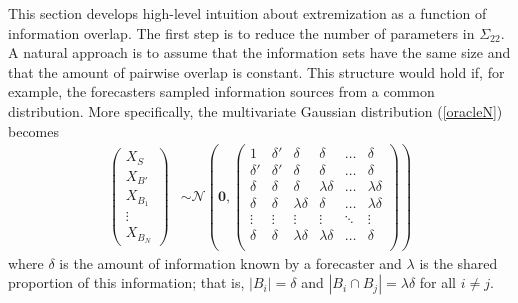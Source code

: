 \documentclass[11pt]{article}
\theoremstyle{definition}
\theoremstyle{definition}
\def\probit{p_{\rm probit}}
\begin{document}
This section develops high-level intuition about extremization as a function of information overlap. The first step is to reduce the number of parameters in $\Sigma_{22}$. A natural approach is to assume that the
information sets have the same size and that the amount of pairwise overlap
is constant.
This structure would hold if, for example, the
forecasters sampled information sources from a common distribution.
More specifically, the multivariate Gaussian distribution
(\ref{oracleN}) becomes
\begin{align}
\left(\begin{matrix} X_{S} \\ X_{B'}\\ X_{B_1}\\ \vdots \\ X_{B_N} \end{matrix}\right) &\sim \mathcal{N}\left( 
 \boldsymbol{0}, 
 \left(\begin{array}{cc|cccc}
1 & \delta'& \delta & \delta & \dots & \delta  \\ 
\delta' & \delta' & \delta & \delta & \dots & \delta  \\ \hline
\delta & \delta &\delta & \lambda\delta & \dots & \lambda\delta   \\ 
\delta& \delta & \lambda\delta & \delta & \dots & \lambda\delta  \\ 
\vdots &\vdots & \vdots & \vdots & \ddots & \vdots  \\ 
\delta &\delta & \lambda\delta & \lambda\delta & \dots & \delta\\ 
 \end{array}\right)\right) \label{symmetric}
\end{align}
where $\delta$ is the amount of information known by a forecaster and
$\lambda$ is the shared proportion of this information; that is, $|B_{i}| =
\delta$ and $|B_{i} \cap B_{j}| = \lambda \delta$ for all $i \neq
j$.
\end{document}
